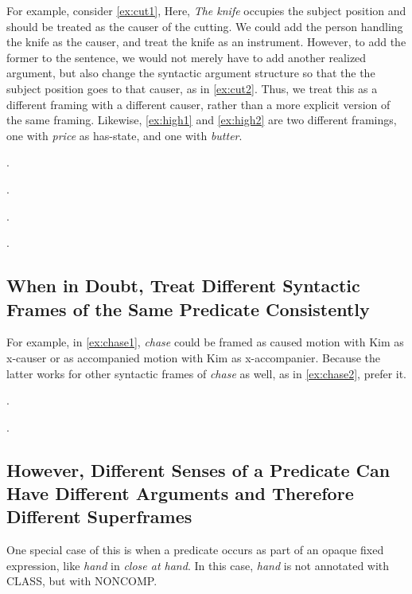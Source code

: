 \documentclass[a4paper]{article}
\newcommand{\fr}[1]{\textsf{#1}}
\newcommand{\rl}[1]{\textsf{#1}}
\begin{document}
For example, consider \ref{ex:cut1}, Here, \emph{The knife} occupies the subject position and should be treated as the causer of the cutting. We could add the person handling the knife as the causer, and treat the knife as an instrument. However, to add the former to the sentence, we would not merely have to add another realized argument, but also change the syntactic argument structure so that the the subject position goes to that causer, as in \ref{ex:cut2}. Thus, we treat this as a different framing with a different causer, rather than a more explicit version of the same framing. Likewise, \ref{ex:high1} and \ref{ex:high2} are two different framings, one with \emph{price} as \rl{has-state}, and one with \emph{butter}.

\ex.\label{ex:cut1}

\ex.\label{ex:cut2}

\ex.\label{ex:high1}

\ex.\label{ex:high2}

\newpage\subsection{When in Doubt, Treat Different Syntactic Frames of the Same Predicate Consistently}

For example, in \ref{ex:chase1}, \emph{chase} could be framed as caused motion
with Kim as \rl{x-causer} or as accompanied motion with Kim as
\rl{x-accompanier}. Because the latter works for other syntactic frames of
\emph{chase} as well, as in \ref{ex:chase2}, prefer it.

\ex.\label{ex:chase1}

\ex.\label{ex:chase2}

\newpage\subsection{However, Different Senses of a Predicate Can Have Different Arguments and Therefore Different Superframes}

One special case of this is when a predicate occurs as part of an opaque fixed
expression, like \emph{hand} in \emph{close at hand}. In this case, \emph{hand}
is not annotated with \fr{CLASS}, but with \fr{NONCOMP}.
\end{document}
